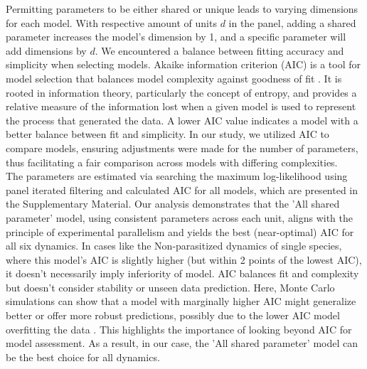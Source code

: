 \documentclass[12pt]{article}
\begin{document}
Permitting parameters to be either shared or unique leads to varying dimensions for each model. With respective amount of units $d$ in the panel, adding a shared parameter increases the model's dimension by 1, and a specific parameter will add dimensions by $d$. We encountered a balance between fitting accuracy and simplicity when selecting models. Akaike information criterion (AIC) is a tool for model selection that balances model complexity against goodness of fit \citep{bozdogan1987model}. It is rooted in information theory, particularly the concept of entropy, and provides a relative measure of the information lost when a given model is used to represent the process that generated the data. A lower AIC value indicates a model with a better balance between fit and simplicity. In our study, we utilized AIC to compare models, ensuring adjustments were made for the number of parameters, thus facilitating a fair comparison across models with differing complexities.\\

The parameters are estimated via searching the maximum log-likelihood using panel iterated filtering and calculated AIC for all models, which are presented in the Supplementary Material. Our analysis demonstrates that the 'All shared parameter' model, using consistent parameters across each unit, aligns with the principle of experimental parallelism and yields the best (near-optimal) AIC for all six dynamics. In cases like the Non-parasitized dynamics of single species, where this model's AIC is slightly higher (but within 2 points of the lowest AIC), it doesn't necessarily imply inferiority of model. AIC balances fit and complexity but doesn't consider stability or unseen data prediction. Here, Monte Carlo simulations can show that a model with marginally higher AIC might generalize better or offer more robust predictions, possibly due to the lower AIC model overfitting the data \citep{nylund2007deciding}. This highlights the importance of looking beyond AIC for model assessment. As a result, in our case, the 'All shared parameter' model can be the best choice for all dynamics.\\
\end{document}
